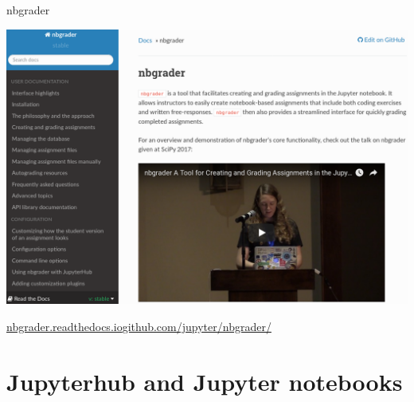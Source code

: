 \documentclass[svgnames]{beamer}
\begin{document}
\begin{frame}{nbgrader}
 \begin{center}
 \includegraphics[width=\textwidth]{nbgrader}
 \end{center}

 \url{nbgrader.readthedocs.io}\qquad \url{github.com/jupyter/nbgrader/}
\end{frame}

\begin{frame}
 \begin{center}
  \begin{minipage}{0.6\textwidth}
   \tableofcontents
  \end{minipage}
 \end{center}
\end{frame}

\section{Jupyterhub and Jupyter notebooks}

\begin{frame}
 \begin{center}
  \begin{minipage}{0.6\textwidth}
   \tableofcontents[currentsection]
  \end{minipage}
 \end{center}
\end{frame}
\end{document}

